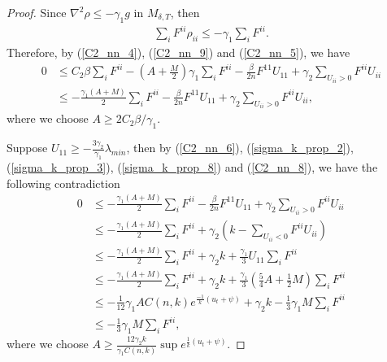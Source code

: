\documentclass[12pt]{amsart}
\theoremstyle{definition}
\theoremstyle{remark}
\numberwithin{equation}{section}
\begin{document}
\begin{proof}
	Since $\nabla^2 \rho \leq - \gamma_1 g$ in $M_{\delta, T}$, then
	\begin{equation}\label{C2_nn_5}
	\begin{aligned}
	\sum_i F^{ii} \rho_{ii} \leq - \gamma_1 \sum_i F^{ii}.
	\end{aligned}
	\end{equation}
	Therefore, by (\ref{C2_nn_4}), (\ref{C2_nn_9}) and (\ref{C2_nn_5}), we have
	\begin{equation}\label{C2_nn_6}
	\begin{aligned}
	0 &\leq C_2 \beta \sum_i F^{ii} - (A + \frac{M}{2}) \gamma_1 \sum_i F^{ii} - \frac{\beta}{2n} F^{11} U_{11} + \gamma_2 \sum_{U_{ii} > 0} F^{ii} U_{ii}\\
	&\leq - \frac{\gamma_1 (A + M)}{2} \sum_i F^{ii} - \frac{\beta}{2n} F^{11} U_{11} + \gamma_2 \sum_{U_{ii} > 0} F^{ii} U_{ii},
	\end{aligned}
	\end{equation}
	where we choose $A \geq 2C_2\beta /\gamma_1$.
	
	
	Suppose $U_{11} \geq - \frac{3\gamma_2}{\gamma_1} \lambda_{min}$, then by (\ref{C2_nn_6}), (\ref{sigma_k_prop_2}), (\ref{sigma_k_prop_3}), (\ref{sigma_k_prop_8}) and (\ref{C2_nn_8}), we have the following contradiction
	\begin{equation}\label{C2_nn_7}
	\begin{aligned}
	0 &\leq - \frac{\gamma_1 (A + M)}{2} \sum_i F^{ii} - \frac{\beta}{2n} F^{11} U_{11} + \gamma_2 \sum_{U_{ii} > 0} F^{ii} U_{ii}\\
	&\leq  - \frac{\gamma_1 (A + M)}{2} \sum_i F^{ii} + \gamma_2 (k - \sum_{U_{ii} < 0} F^{ii} U_{ii}) \\
	&\leq - \frac{\gamma_1 (A + M)}{2} \sum_i F^{ii} + \gamma_2 k + \frac{\gamma_1}{3} U_{11} \sum_{i} F^{ii}\\
	&\leq - \frac{\gamma_1 (A + M)}{2} \sum_i F^{ii} + \gamma_2 k + \frac{\gamma_1}{3} (\frac{5}{4} A + \frac{1}{2}M) \sum_{i} F^{ii}\\ 
	&\leq - \frac{1}{12}\gamma_1 A C(n, k) e^{\frac{-1}{k}(u_t + \psi)} + \gamma_2 k - \frac{1}{3}\gamma_1 M\sum_i F^{ii} \\
	&\leq - \frac{1}{3}\gamma_1 M\sum_i F^{ii},
	\end{aligned}
	\end{equation}
	where we choose $A \geq \frac{12\gamma_2 k}{\gamma_1 C(n,k)} \sup e^{\frac{1}{k}(u_t + \psi)}$.
	

\end{proof}
\end{document}
